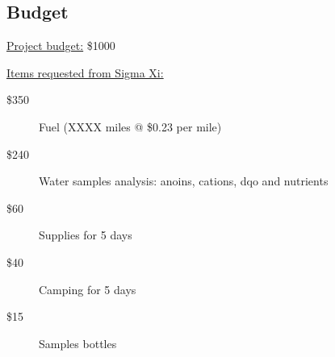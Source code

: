 \documentclass[11pt,a4paper,oneside]{article}
\begin{document}
\vfill
\vfill


% 
% 


\newpage

\subsection*{Budget}

\underline{Project budget:} \$1000

\bigskip

\noindent \underline{Items requested from Sigma Xi:}

\begin{description} %
	\item[\$350] Fuel (XXXX miles @ \$0.23 per mile)
	\item[\$240] Water samples analysis: anoins, cations, dqo and nutrients
	\item[\$60] Supplies for 5 days
	\item[\$40] Camping for 5 days
	\item[\$15] Samples bottles
\end{description}



\end{document}
